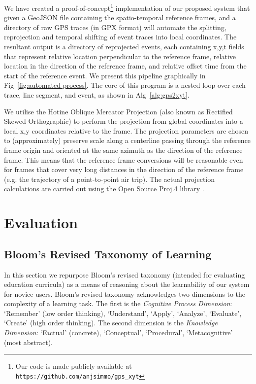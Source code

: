 We have created a proof-of-concept\footnote{Our code is made publicly available at \texttt{https://github.com/anjsimmo/gps\_xyt}} implementation of our proposed system that given a GeoJSON file containing the spatio-temporal reference frames, and a directory of raw GPS traces (in GPX format) will automate the splitting, reprojection and temporal shifting of event traces into local coordinates. The resultant output is a directory of reprojected events, each containing x,y,t fields that represent relative location perpendicular to the reference frame, relative location in the direction of the reference frame, and relative offset time from the start of the reference event. We present this pipeline graphically in Fig~\ref{fig:automated-process}. The core of this program is a nested loop over each trace, line segment, and event, as shown in Alg~\ref{alg:gps2xyt}.

We utilise the Hotine Oblique Mercator Projection (also known as Rectified Skewed Orthographic) \citep[p. 66]{snyder_map_1987} to perform the projection from global coordinates into a local x,y coordinates relative to the frame. The projection parameters are chosen to (approximately) preserve scale along a centerline passing through the reference frame origin and oriented at the same azimuth as the direction of the reference frame. This means that the reference frame conversions will be reasonable even for frames that cover very long distances in the direction of the reference frame (e.g. the trajectory of a point-to-point air trip). The actual projection calculations are carried out using the Open Source Proj.4 library \cite{evenden_libproj4_2005}.

\section{Evaluation}

\subsection{Bloom's Revised Taxonomy of Learning}

In this section we repurpose Bloom's revised taxonomy \cite{anderson_taxonomy_2001} (intended for evaluating education curricula) as a means of reasoning about the learnability of our system for novice users. Bloom's revised taxonomy acknowledges two dimensions to the complexity of a learning task. The first is the \textit{Cognitive Process Dimension}: `Remember' (low order thinking), `Understand', `Apply', `Analyze', `Evaluate', `Create' (high order thinking). The second dimension is the \textit{Knowledge Dimension}: `Factual' (concrete), `Conceptual', `Procedural', `Metacognitive' (most abstract).

